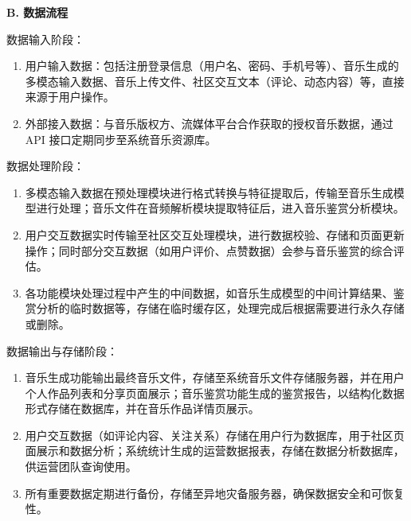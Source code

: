 \documentclass{base}
\numberwithin{figure}{section} %
\begin{document}
\textbf{B. 数据流程}

数据输入阶段：

\begin{enumerate}
    \item 用户输入数据：包括注册登录信息（用户名、密码、手机号等）、音乐生成的多模态输入数据、音乐上传文件、社区交互文本（评论、动态内容）等，直接来源于用户操作。​
    \item 外部接入数据：与音乐版权方、流媒体平台合作获取的授权音乐数据，通过 API 接口定期同步至系统音乐资源库。
\end{enumerate}

数据处理阶段：

\begin{enumerate}
    \item 多模态输入数据在预处理模块进行格式转换与特征提取后，传输至音乐生成模型进行处理；音乐文件在音频解析模块提取特征后，进入音乐鉴赏分析模块。​
    \item 用户交互数据实时传输至社区交互处理模块，进行数据校验、存储和页面更新操作；同时部分交互数据（如用户评价、点赞数据）会参与音乐鉴赏的综合评估。​
    \item 各功能模块处理过程中产生的中间数据，如音乐生成模型的中间计算结果、鉴赏分析的临时数据等，存储在临时缓存区，处理完成后根据需要进行永久存储或删除。
\end{enumerate}

数据输出与存储阶段：

\begin{enumerate}
    \item 音乐生成功能输出最终音乐文件，存储至系统音乐文件存储服务器，并在用户个人作品列表和分享页面展示；音乐鉴赏功能生成的鉴赏报告，以结构化数据形式存储在数据库，并在音乐作品详情页展示。
    \item 用户交互数据（如评论内容、关注关系）存储在用户行为数据库，用于社区页面展示和数据分析；系统统计生成的运营数据报表，存储在数据分析数据库，供运营团队查询使用。​
    \item 所有重要数据定期进行备份，存储至异地灾备服务器，确保数据安全和可恢复性。
\end{enumerate}
\end{document}

